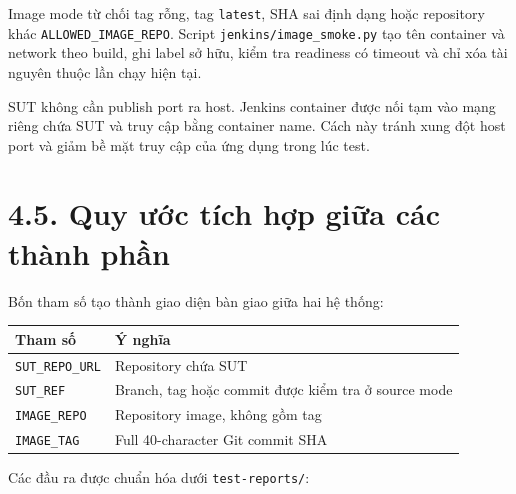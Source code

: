 \documentclass[
  vietnamese,
  12pt,
  a4paper,
  oneside]{report}
\begin{document}
Image mode từ chối tag rỗng, tag \texttt{latest}, SHA sai định dạng hoặc
repository khác \texttt{ALLOWED\_IMAGE\_REPO}. Script
\texttt{jenkins/image\_smoke.py} tạo tên container và network theo
build, ghi label sở hữu, kiểm tra readiness có timeout và chỉ xóa tài
nguyên thuộc lần chạy hiện tại.

SUT không cần publish port ra host. Jenkins container được nối tạm vào
mạng riêng chứa SUT và truy cập bằng container name. Cách này tránh xung
đột host port và giảm bề mặt truy cập của ứng dụng trong lúc test.

\section{4.5. Quy ước tích hợp giữa các thành
phần}\label{45-quy-ux1b0ux1edbc-tuxedch-hux1ee3p-giux1eefa-cuxe1c-thuxe0nh-phux1ea7n}

Bốn tham số tạo thành giao diện bàn giao giữa hai hệ thống:

\begin{longtable}[]{@{}
  >{\raggedright\arraybackslash}p{}
  >{\raggedright\arraybackslash}p{}@{}}
\toprule\noalign{}
\begin{minipage}[b]{\linewidth}\raggedright
Tham số
\end{minipage} & \begin{minipage}[b]{\linewidth}\raggedright
Ý nghĩa
\end{minipage} \\
\midrule\noalign{}
\endhead
\bottomrule\noalign{}
\endlastfoot
\texttt{SUT\_REPO\_URL} & Repository chứa SUT \\
\texttt{SUT\_REF} & Branch, tag hoặc commit được kiểm tra ở source
mode \\
\texttt{IMAGE\_REPO} & Repository image, không gồm tag \\
\texttt{IMAGE\_TAG} & Full 40-character Git commit SHA \\
\end{longtable}

Các đầu ra được chuẩn hóa dưới \texttt{test-reports/}:
\end{document}
